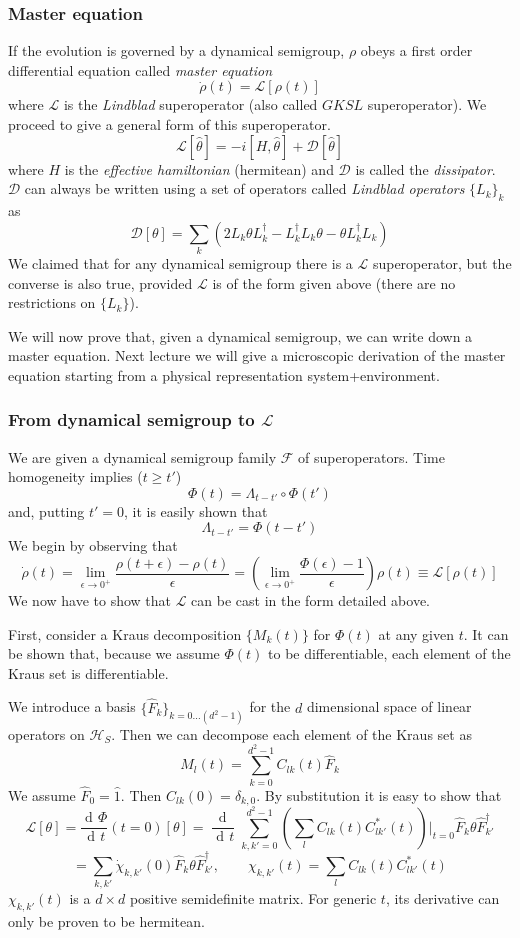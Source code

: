 \documentclass[a4paper, 11pt]{article}
\newcommand{\dd}{\mathop{\mathrm{d}\!}{}}
\newcommand{\deriv}[2]{\dfrac{\dd #1}{\dd #2}}
\newcommand{\HH}{\mathcal{H}}
\newcommand{\LL}{\mathcal{L}}
\begin{document}
	\subsubsection{Master equation}
	If the evolution is governed by a dynamical semigroup, $\rho$ obeys a first order differential equation called \emph{master equation}
	\[ \dot{\rho}(t) = \LL\left[ \rho(t) \right] \]
	where $\LL$ is the \emph{Lindblad} superoperator (also called $GKSL$ superoperator). We proceed to give a general form of this superoperator.
	\[ \LL[\hat{\theta}] = -i \left[H, \hat{\theta}\right] + \mathcal{D}[\hat{\theta}] \]
	where $H$ is the \emph{effective hamiltonian} (hermitean) and $\mathcal{D}$ is called the \emph{dissipator}. $\mathcal{D}$ can always be written using a set of operators called \emph{Lindblad operators} $\{ L_k \}_k$ as
	\[ \mathcal{D}[\theta] = \sum_k \left(2 L_k\theta L_k^\dagger - L_k^\dagger L_k \theta - \theta L_k^\dagger L_k \right) \]
	We claimed that for any dynamical semigroup there is a $\LL$ superoperator, but the converse is also true, provided $\LL$ is of the form given above (there are no restrictions on $\{L_k\}$).
	
	We will now prove that, given a dynamical semigroup, we can write down a master equation. Next lecture we will give a microscopic derivation of the master equation starting from a physical representation system+environment.
	
	\subsubsection{From dynamical semigroup to $\LL$}
	We are given a dynamical semigroup family $\mathcal{F}$ of superoperators. Time homogeneity implies ($t \ge t'$)
	\[ \Phi(t) = \Lambda_{t-t'} \circ \Phi(t') \]
	and, putting $t'=0$, it is easily shown that
	\[ \Lambda_{t-t'} = \Phi(t-t') \]
	We begin by observing that
	\[ \dot{\rho}(t) = \lim_{\epsilon\rightarrow 0^+} \dfrac{\rho(t+\epsilon)-\rho(t)}{\epsilon} = \left(\lim_{\epsilon\rightarrow 0^+}
	\dfrac{\Phi(\epsilon)-1}{\epsilon}\right) \rho(t) \equiv \LL[\rho(t)] \]
	We now have to show that $\LL$ can be cast in the form detailed above.
	
	First, consider a Kraus decomposition $\{M_k(t)\}$ for $\Phi(t)$ at any given $t$. It can be shown that, because we assume $\Phi(t)$ to be differentiable, each element of the Kraus set is differentiable.
	
	We introduce a basis $\{\hat{F}_k\}_{k=0\dots (d^2-1)}$ for the $d$ dimensional space of linear operators on $\HH_S$.
	Then we can decompose each element of the Kraus set as
	\[ M_l(t) = \sum_{k=0}^{d^2-1} C_{lk}(t) \hat{F}_k \]
	We assume $\hat{F}_0 = \hat{1}$. Then $C_{lk}(0) = \delta_{k,0}$. By substitution it is easy to show that
	\[ \LL[\theta] = \deriv{\Phi}{t}(t=0) [\theta] = \deriv{}{t} \sum_{k,k'=0}^{d^2-1} \left( \sum_l C_{lk}(t) C_{lk'}^*(t) \right)|_{t=0} \hat{F}_k \theta \hat{F}_{k'}^\dagger \]
	\[ = \sum_{k,k'} \dot{\chi}_{k,k'}(0) \hat{F}_k \theta \hat{F}_{k'}^\dagger,\qquad \chi_{k,k'}(t) = \sum_l C_{lk}(t) C_{lk'}^*(t) \]
	$\chi_{k,k'}(t)$ is a $d \times d$ positive semidefinite matrix. For generic $t$, its derivative can only be proven to be hermitean.
	
\end{document}
